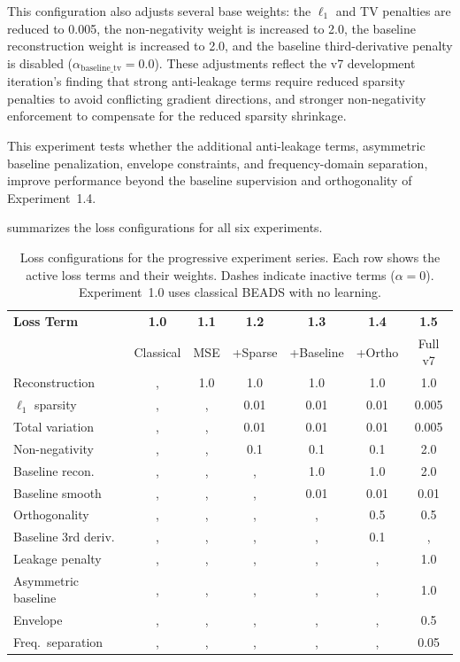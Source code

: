 This configuration also adjusts several base weights: the $\ell_1$ and TV penalties are reduced to 0.005, the non-negativity weight is increased to 2.0, the baseline reconstruction weight is increased to 2.0, and the baseline third-derivative penalty is disabled ($\alpha_{\text{baseline\_tv}} = 0.0$). These adjustments reflect the v7 development iteration's finding that strong anti-leakage terms require reduced sparsity penalties to avoid conflicting gradient directions, and stronger non-negativity enforcement to compensate for the reduced sparsity shrinkage.

This experiment tests whether the additional anti-leakage terms, asymmetric baseline penalization, envelope constraints, and frequency-domain separation, improve performance beyond the baseline supervision and orthogonality of Experiment~1.4.

 summarizes the loss configurations for all six experiments.

\begin{table}[t]
    \centering
    \caption{Loss configurations for the progressive experiment series. Each row shows the active loss terms and their weights. Dashes indicate inactive terms ($\alpha = 0$). Experiment~1.0 uses classical BEADS with no learning.}
    \label{tab:progressive_configs}
    \small
    \begin{tabular}{@{}lcccccc@{}}
        \toprule
        \textbf{Loss Term} & \textbf{1.0} & \textbf{1.1} & \textbf{1.2} & \textbf{1.3} & \textbf{1.4} & \textbf{1.5} \\
         & Classical & MSE & +Sparse & +Baseline & +Ortho & Full v7 \\
        \midrule
        Reconstruction       & ,  & 1.0 & 1.0  & 1.0  & 1.0  & 1.0 \\
        $\ell_1$ sparsity    & ,  & ,  & 0.01 & 0.01 & 0.01 & 0.005 \\
        Total variation      & ,  & ,  & 0.01 & 0.01 & 0.01 & 0.005 \\
        Non-negativity       & ,  & ,  & 0.1  & 0.1  & 0.1  & 2.0 \\
        Baseline recon.      & ,  & ,  & ,   & 1.0  & 1.0  & 2.0 \\
        Baseline smooth      & ,  & ,  & ,   & 0.01 & 0.01 & 0.01 \\
        Orthogonality        & ,  & ,  & ,   & ,   & 0.5  & 0.5 \\
        Baseline 3rd deriv.  & ,  & ,  & ,   & ,   & 0.1  & ,  \\
        Leakage penalty      & ,  & ,  & ,   & ,   & ,   & 1.0 \\
        Asymmetric baseline  & ,  & ,  & ,   & ,   & ,   & 1.0 \\
        Envelope             & ,  & ,  & ,   & ,   & ,   & 0.5 \\
        Freq.\ separation    & ,  & ,  & ,   & ,   & ,   & 0.05 \\
        \bottomrule
    \end{tabular}
\end{table}


